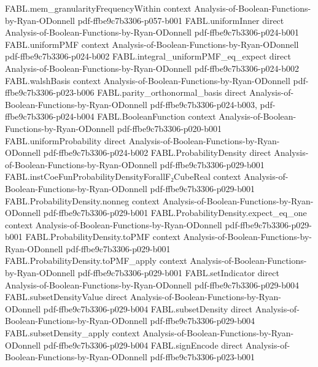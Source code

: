 \begin{theorem}
\proofstep
  {FABL.mem_granularityFrequencyWithin}
  {context}
  {Analysis-of-Boolean-Functions-by-Ryan-ODonnell}
  {pdf-ffbe9c7b3306-p057-b001}
\proofstep
  {FABL.uniformInner}
  {direct}
  {Analysis-of-Boolean-Functions-by-Ryan-ODonnell}
  {pdf-ffbe9c7b3306-p024-b001}
\proofstep
  {FABL.uniformPMF}
  {context}
  {Analysis-of-Boolean-Functions-by-Ryan-ODonnell}
  {pdf-ffbe9c7b3306-p024-b002}
\proofstep
  {FABL.integral_uniformPMF_eq_expect}
  {direct}
  {Analysis-of-Boolean-Functions-by-Ryan-ODonnell}
  {pdf-ffbe9c7b3306-p024-b002}
\proofstep
  {FABL.walshBasis}
  {context}
  {Analysis-of-Boolean-Functions-by-Ryan-ODonnell}
  {pdf-ffbe9c7b3306-p023-b006}
\proofstep
  {FABL.parity_orthonormal_basis}
  {direct}
  {Analysis-of-Boolean-Functions-by-Ryan-ODonnell}
  {pdf-ffbe9c7b3306-p024-b003,
    pdf-ffbe9c7b3306-p024-b004}
\proofstep
  {FABL.BooleanFunction}
  {context}
  {Analysis-of-Boolean-Functions-by-Ryan-ODonnell}
  {pdf-ffbe9c7b3306-p020-b001}
\proofstep
  {FABL.uniformProbability}
  {direct}
  {Analysis-of-Boolean-Functions-by-Ryan-ODonnell}
  {pdf-ffbe9c7b3306-p024-b002}
\proofstep
  {FABL.ProbabilityDensity}
  {direct}
  {Analysis-of-Boolean-Functions-by-Ryan-ODonnell}
  {pdf-ffbe9c7b3306-p029-b001}
\proofstep
  {FABL.instCoeFunProbabilityDensityForallF₂CubeReal}
  {context}
  {Analysis-of-Boolean-Functions-by-Ryan-ODonnell}
  {pdf-ffbe9c7b3306-p029-b001}
\proofstep
  {FABL.ProbabilityDensity.nonneg}
  {context}
  {Analysis-of-Boolean-Functions-by-Ryan-ODonnell}
  {pdf-ffbe9c7b3306-p029-b001}
\proofstep
  {FABL.ProbabilityDensity.expect_eq_one}
  {context}
  {Analysis-of-Boolean-Functions-by-Ryan-ODonnell}
  {pdf-ffbe9c7b3306-p029-b001}
\proofstep
  {FABL.ProbabilityDensity.toPMF}
  {context}
  {Analysis-of-Boolean-Functions-by-Ryan-ODonnell}
  {pdf-ffbe9c7b3306-p029-b001}
\proofstep
  {FABL.ProbabilityDensity.toPMF_apply}
  {context}
  {Analysis-of-Boolean-Functions-by-Ryan-ODonnell}
  {pdf-ffbe9c7b3306-p029-b001}
\proofstep
  {FABL.setIndicator}
  {direct}
  {Analysis-of-Boolean-Functions-by-Ryan-ODonnell}
  {pdf-ffbe9c7b3306-p029-b004}
\proofstep
  {FABL.subsetDensityValue}
  {direct}
  {Analysis-of-Boolean-Functions-by-Ryan-ODonnell}
  {pdf-ffbe9c7b3306-p029-b004}
\proofstep
  {FABL.subsetDensity}
  {direct}
  {Analysis-of-Boolean-Functions-by-Ryan-ODonnell}
  {pdf-ffbe9c7b3306-p029-b004}
\proofstep
  {FABL.subsetDensity_apply}
  {context}
  {Analysis-of-Boolean-Functions-by-Ryan-ODonnell}
  {pdf-ffbe9c7b3306-p029-b004}
\proofstep
  {FABL.signEncode}
  {direct}
  {Analysis-of-Boolean-Functions-by-Ryan-ODonnell}
  {pdf-ffbe9c7b3306-p023-b001}

\end{theorem}
